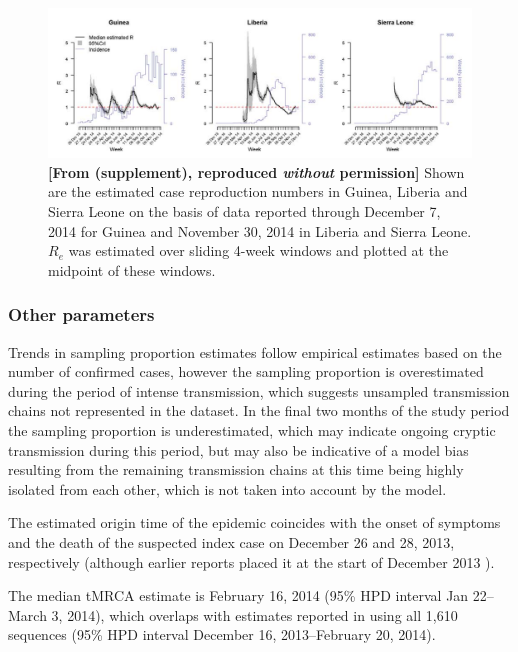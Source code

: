 	\begin{figure}[!ht]
		\includegraphics[width=\textwidth]{figures/WHO2}
		\caption{\textbf{[From \citep{WHO2015NEJM} (supplement), reproduced \emph{without} permission]}
	Shown are the estimated case reproduction numbers in Guinea, Liberia and Sierra Leone on the basis of data reported through December 7, 2014 for Guinea and November 30, 2014 in Liberia and Sierra Leone. $R_e$ was estimated over sliding 4-week windows and plotted at the midpoint of these windows.} 
		\label{fig:WHO}
	\end{figure}


\subsubsection*{Other parameters}

	Trends in sampling proportion estimates follow empirical estimates based on the number of confirmed cases, however the sampling proportion is overestimated during the period of intense transmission, which suggests unsampled transmission chains not represented in the dataset. 
	In the final two months of the study period the sampling proportion is underestimated, which may indicate ongoing cryptic transmission during this period, but may also be indicative of a model bias resulting from the remaining transmission chains at this time being highly isolated from each other, which is not taken into account by the model. 

	The estimated origin time of the epidemic coincides with the onset of symptoms and the death of the suspected index case \citep{WHO2016NEJM} on December 26 and 28, 2013, respectively (although earlier reports placed it at the start of December 2013 \citep{Baize2014NEJM}). 

	The median tMRCA estimate is February 16, 2014 (95\% HPD interval Jan 22--March 3, 2014), which overlaps with estimates reported in \citet{Dudas2017Nature} using all 1,610 sequences (95\% HPD interval December 16, 2013--February 20, 2014).

